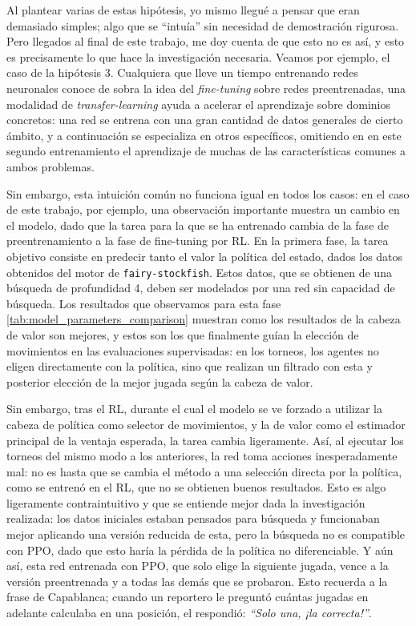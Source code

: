 \documentclass[12pt, a4paper]{article}
\begin{document}
Al plantear varias de estas hipótesis, yo mismo llegué a pensar que eran demasiado simples; algo que se ``intuía'' sin necesidad de demostración rigurosa.\\
Pero llegados al final de este trabajo, me doy cuenta de que esto no es así, y esto es precisamente lo que hace la investigación necesaria. Veamos por ejemplo, el caso de la hipótesis 3. Cualquiera que lleve un tiempo entrenando redes neuronales conoce de sobra la idea del \textit{fine-tuning} sobre redes preentrenadas, una modalidad de \textit{transfer-learning} ayuda a acelerar el aprendizaje sobre dominios concretos: una red se entrena con una gran cantidad de datos generales de cierto ámbito, y a continuación se especializa en otros específicos, omitiendo en en este segundo entrenamiento el aprendizaje de muchas de las características comunes a ambos problemas.

Sin embargo, esta intuición común no funciona igual en todos los casos: en el caso de este trabajo, por ejemplo, una observación importante muestra un cambio en el modelo, dado que la tarea para la que se ha entrenado cambia de la fase de preentrenamiento a la fase de fine-tuning por RL. En la primera fase, la tarea objetivo consiste en predecir tanto el valor la política del estado, dados los datos obtenidos del motor de \texttt{fairy-stockfish}. Estos datos, que se obtienen de una búsqueda de profundidad 4, deben ser modelados por una red sin capacidad de búsqueda. Los resultados que observamos para esta fase \ref{tab:model_parameters_comparison} muestran como los resultados de la cabeza de valor son mejores, y estos son los que finalmente guían la elección de movimientos en las evaluaciones supervisadas: en los torneos, los agentes no eligen directamente con la política, sino que realizan un filtrado con esta y posterior elección de la mejor jugada según la cabeza de valor.

Sin embargo, tras el RL, durante el cual el modelo se ve forzado a utilizar la cabeza de política como selector de movimientos, y la de valor como el estimador principal de la ventaja esperada, la tarea cambia ligeramente. Así, al ejecutar los torneos del mismo modo a los anteriores, la red toma acciones inesperadamente mal: no es hasta que se cambia el método a una selección directa por la política, como se entrenó en el RL, que no se obtienen buenos resultados. Esto es algo ligeramente contraintuitivo y que se entiende mejor dada la investigación realizada: los datos iniciales estaban pensados para búsqueda y funcionaban mejor aplicando una versión reducida de esta, pero la búsqueda no es compatible con PPO, dado que esto haría la pérdida de la política no diferenciable. Y aún así, esta red entrenada con PPO, que solo elige la siguiente jugada, vence a la versión preentrenada y a todas las demás que se probaron. Esto recuerda a la frase de Capablanca; cuando un reportero le preguntó cuántas jugadas en adelante calculaba en una posición, el respondió: \textit{``Solo una, ¡la correcta!''}.
\end{document}

